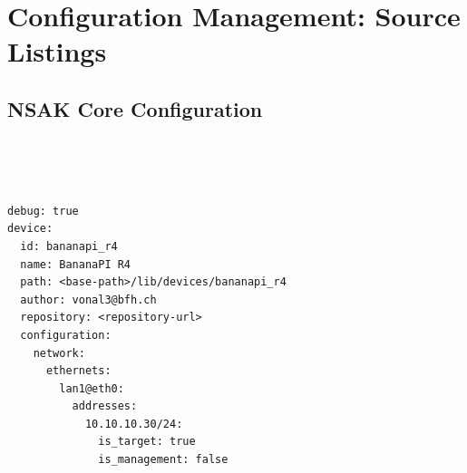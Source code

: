 \section{Configuration Management: Source Listings}\label{sec:appendix-configuration-management-listings}

\subsection{NSAK Core Configuration}\label{subsec:appendix-nsak-core-configuration}

\begin{listing}[H]
    \inputminted[lastline=37]{python}{../../../src/nsak/core/settings.py}
    \caption{NSAK Static Configuration}
    \label{lst:nsak-settings}
\end{listing}

\begin{listing}[H]
    \inputminted[firstline=40]{python}{../../../src/nsak/core/settings.py}
    \caption{NSAK Static Configuration - Continued}
    \label{lst:nsak-settings-continued}
\end{listing}

\begin{listing}[H]
    \inputminted[lastline=60]{python}{../../../src/nsak/core/configuration/configuration.py}
    \caption{NSAK Runtime Configuration}
    \label{lst:nsak-config}
\end{listing}

\begin{listing}[H]
    \inputminted[firstline=62]{python}{../../../src/nsak/core/configuration/configuration.py}
    \caption{NSAK Runtime Configuration - continued}
    \label{lst:nsak-config-continued}
\end{listing}

\begin{listing}[H]
    \inputminted{python}{../../../src/nsak/cli/__init__.py}
    \caption{NSAK CLI Initialisation}
    \label{lst:nsak-cli-init}
\end{listing}

\begin{listing}[H]
    \begin{verbatim}
debug: true
device:
  id: bananapi_r4
  name: BananaPI R4
  path: <base-path>/lib/devices/bananapi_r4
  author: vonal3@bfh.ch
  repository: <repository-url>
  configuration:
    network:
      ethernets:
        lan1@eth0:
          addresses:
            10.10.10.30/24:
              is_target: true
              is_management: false
    \end{verbatim}
    \caption{Persisted Runtime Configuration (run/config.yaml)}
    \label{lst:nsak-config-yaml}
\end{listing}


